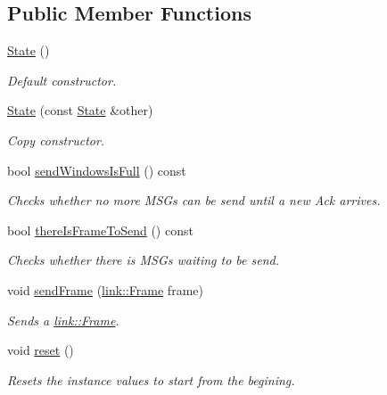 \subsection*{Public Member Functions}
\begin{DoxyCompactItemize}
\item 
\hyperlink{structswp_1_1State_acb33f7cd743bda0db9c1b7b92cf2b2ea}{State} ()
\begin{DoxyCompactList}\small\item\em Default constructor. \end{DoxyCompactList}\item 
\hyperlink{structswp_1_1State_a2eb6824bd9f7bfa5e84b402ce3915334}{State} (const \hyperlink{structswp_1_1State}{State} \&other)
\begin{DoxyCompactList}\small\item\em Copy constructor. \end{DoxyCompactList}\item 
bool \hyperlink{structswp_1_1State_ad932ee3326683cbee09e8a8b36f26b9b}{send\+Windows\+Is\+Full} () const 
\begin{DoxyCompactList}\small\item\em Checks whether no more M\+S\+Gs can be send until a new Ack arrives. \end{DoxyCompactList}\item 
bool \hyperlink{structswp_1_1State_a5a9c617b0cf8b06e442d10b6e3d98143}{there\+Is\+Frame\+To\+Send} () const 
\begin{DoxyCompactList}\small\item\em Checks whether there is M\+S\+Gs waiting to be send. \end{DoxyCompactList}\item 
void \hyperlink{structswp_1_1State_adc781763914d3d1de3ff5c462f1f76ef}{send\+Frame} (\hyperlink{structlink_1_1Frame}{link\+::\+Frame} frame)\hypertarget{structswp_1_1State_adc781763914d3d1de3ff5c462f1f76ef}{}\label{structswp_1_1State_adc781763914d3d1de3ff5c462f1f76ef}

\begin{DoxyCompactList}\small\item\em Sends a \hyperlink{structlink_1_1Frame}{link\+::\+Frame}. \end{DoxyCompactList}\item 
void \hyperlink{structswp_1_1State_a02c83f258bba472f268c119768147def}{reset} ()\hypertarget{structswp_1_1State_a02c83f258bba472f268c119768147def}{}\label{structswp_1_1State_a02c83f258bba472f268c119768147def}

\begin{DoxyCompactList}\small\item\em Resets the instance values to start from the begining. \end{DoxyCompactList}\end{DoxyCompactItemize}
